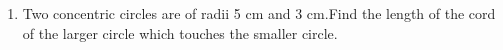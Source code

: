 \documentclass[12pt,A4 paper]{article}
\begin{document}
\begin{flushleft}
\begin{enumerate}
\begin{flushright}
    \end{flushright}
\item Two concentric circles are of radii 5 cm and 3 cm.Find the length of the cord of the larger circle which touches the smaller circle.\\

         
\end{enumerate}
\end{flushleft}
\end{document}
